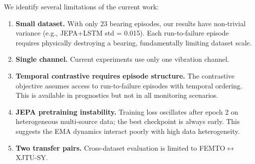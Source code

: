 We identify several limitations of the current work:

\begin{enumerate}[nosep]
  \item \textbf{Small dataset.} With only 23 bearing episodes, our results have non-trivial variance (e.g., JEPA+LSTM std = 0.015). Each run-to-failure episode requires physically destroying a bearing, fundamentally limiting dataset scale.
  \item \textbf{Single channel.} Current experiments use only one vibration channel. 
  \item \textbf{Temporal contrastive requires episode structure.} The contrastive objective assumes access to run-to-failure episodes with temporal ordering. This is available in prognostics but not in all monitoring scenarios.
  \item \textbf{JEPA pretraining instability.} Training loss oscillates after epoch 2 on heterogeneous multi-source data; the best checkpoint is always early. This suggests the EMA dynamics interact poorly with high data heterogeneity.
  \item \textbf{Two transfer pairs.} Cross-dataset evaluation is limited to FEMTO$\leftrightarrow$XJTU-SY. 
\end{enumerate}
